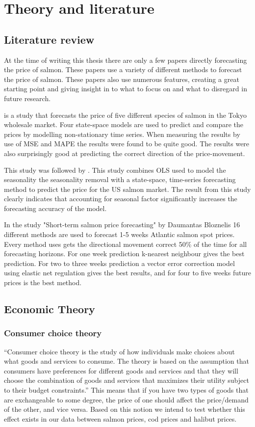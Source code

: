 \section{Theory and literature}

\subsection{Literature review}
At the time of writing this thesis there are only a few papers directly forecasting the price of salmon. These papers use a variety of different methods to forecast the price of salmon. These papers also use numerous features, creating a great starting point and giving insight in to what to focus on and what to disregard in future research. 

\textcite{vukina_1994} is a study that forecasts the price of five different species of salmon in the Tokyo wholesale market. Four state-space models are used to predict and compare the prices by modelling non-stationary time series. When measuring the results by use of MSE and MAPE the results were found to be quite good. The results were also surprisingly good at predicting the correct direction of the price-movement.

This study was followed by \textcite{gu_anderson_1995}. This study combines OLS used to model the seasonality the seasonality removal with a state-space, time-series forecasting method to predict the price for the US salmon market. The result from this study clearly indicates that accounting for seasonal factor significantly increases the forecasting accuracy of the model.

In the study "Short-term salmon price forecasting" by Daumantas Bloznelis 16 different methods are used to forecast 1-5 weeks Atlantic salmon spot prices. Every method \textcite{bloznelis_2017} uses gets the directional movement correct 50\% of the time for all forecasting horizons. For one week prediction k-nearest neighbour gives the best prediction. For two to three weeks prediction a vector error correction model using elastic net regulation gives the best results, and for four to five weeks future prices is the best method.

\subsection{Economic Theory}
\subsubsection{Consumer choice theory}
``Consumer choice theory is the study of how individuals make choices about what goods and services to consume. The theory is based on the assumption that consumers have preferences for different goods and services and that they will choose the combination of goods and services that maximizes their utility subject to their budget constraints.'' \parencite{Perloff_2017} This means that if you have two types of goods that are exchangeable to some degree, the price of one should affect the price/demand of the other, and vice versa. Based on this notion we intend to test whether this effect exists in our data between salmon prices, cod prices and halibut prices.

